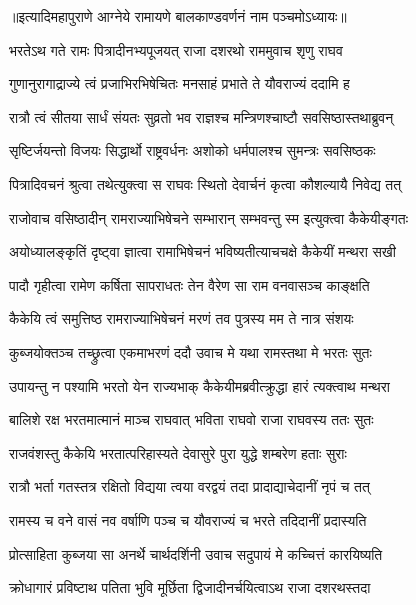 ॥इत्यादिमहापुराणे आग्नेये रामायणे बालकाण्डवर्णनं नाम पञ्चमोऽध्यायः॥




\twolineshloka
{भरतेऽथ गते रामः पित्रादीनभ्यपूजयत्}
{राजा दशरथो राममुवाच शृणु राघव} %

\twolineshloka
{गुणानुरागाद्राज्ये त्वं प्रजाभिरभिषेचितः}
{मनसाहं प्रभाते ते यौवराज्यं ददामि ह} %

\twolineshloka
{रात्रौ त्वं सीतया सार्धं संयतः सुव्रतो भव}
{राज्ञश्च मन्त्रिणश्चाष्टौ सवसिष्ठास्तथाब्रुवन्} %

\twolineshloka
{सृष्टिर्जयन्तो विजयः सिद्धार्थो राष्ट्रवर्धनः}
{अशोको धर्मपालश्च सुमन्त्रः सवसिष्ठकः} %

\twolineshloka
{पित्रादिवचनं श्रुत्वा तथेत्युक्त्वा स राघवः}
{स्थितो देवार्चनं कृत्वा कौशल्यायै निवेद्य तत्} %

\twolineshloka
{राजोवाच वसिष्ठादीन् रामराज्याभिषेचने}
{सम्भारान् सम्भवन्तु स्म इत्युक्त्वा कैकेयीङ्गतः} %

\twolineshloka
{अयोध्यालङ्कृतिं दृष्ट्वा ज्ञात्वा रामाभिषेचनं}
{भविष्यतीत्याचचक्षे कैकेयीं मन्थरा सखी} %

\twolineshloka
{पादौ गृहीत्वा रामेण कर्षिता सापराधतः}
{तेन वैरेण सा राम वनवासञ्च काङ्क्षति} %

\twolineshloka
{कैकेयि त्वं समुत्तिष्ठ रामराज्याभिषेचनं}
{मरणं तव पुत्रस्य मम ते नात्र संशयः} %

\twolineshloka
{कुब्जयोक्तञ्च तच्छ्रुत्वा एकमाभरणं ददौ}
{उवाच मे यथा रामस्तथा मे भरतः सुतः} %

\twolineshloka
{उपायन्तु न पश्यामि भरतो येन राज्यभाक्}
{कैकेयीमब्रवीत्क्रुद्धा हारं त्यक्त्वाथ मन्थरा} %

\twolineshloka
{बालिशे रक्ष भरतमात्मानं माञ्च राघवात्}
{भविता राघवो राजा राघवस्य ततः सुतः} %

\twolineshloka
{राजवंशस्तु कैकेयि भरतात्परिहास्यते}
{देवासुरे पुरा युद्धे शम्बरेण हताः सुराः} %

\twolineshloka
{रात्रौ भर्ता गतस्तत्र रक्षितो विद्यया त्वया}
{वरद्वयं तदा प्रादाद्याचेदानीं नृपं च तत्} %

\twolineshloka
{रामस्य च वने वासं नव वर्षाणि पञ्च च}
{यौवराज्यं च भरते तदिदानीं प्रदास्यति} %

\twolineshloka
{प्रोत्साहिता कुब्जया सा अनर्थे चार्थदर्शिनी}
{उवाच सदुपायं मे कच्चित्तं कारयिष्यति} %

\twolineshloka
{क्रोधागारं प्रविष्टाथ पतिता भुवि मूर्छिता}
{द्विजादीनर्चयित्वाऽथ राजा दशरथस्तदा} %

